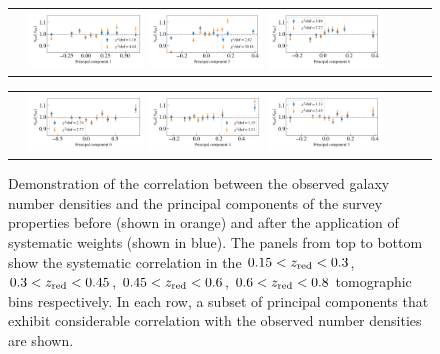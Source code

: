 \documentclass[fleqn,usenatbib,useAMS]{mnras}
\begin{document}
\begin{figure}
\begin{tabular}{ccc}
\includegraphics[width=0.3\textwidth]{figures_tmp/sys/result_pca_ngal_0_45_1_poly_1.png}
\includegraphics[width=0.3\textwidth]{figures_tmp/sys/result_pca_ngal_0_45_5_poly_1.png}
\includegraphics[width=0.3\textwidth]{figures_tmp/sys/result_pca_ngal_0_45_6_poly_1.png}
\end{tabular}

\begin{tabular}{ccc}
\includegraphics[width=0.3\textwidth]{figures_tmp/sys/result_pca_ngal_0_6_0_poly_1.png}
\includegraphics[width=0.3\textwidth]{figures_tmp/sys/result_pca_ngal_0_6_4_poly_1.png}
\includegraphics[width=0.3\textwidth]{figures_tmp/sys/result_pca_ngal_0_6_5_poly_1.png}
\end{tabular}

\caption{\label{fig:sys_ng_correlation} Demonstration of the correlation between the observed galaxy number densities and the principal components of the survey properties before (shown in orange) and after the application of systematic weights (shown in blue). The panels from top to bottom show the systematic correlation in the $0.15<z_{\rm red}<0.3$, $0.3<z_{\rm red}<0.45$, $0.45<z_{\rm red}<0.6$, $0.6<z_{\rm red}<0.8$ tomographic bins respectively. In each row, a subset of principal components that exhibit considerable correlation with the observed number densities are shown.} 
\end{figure}
\end{document}
